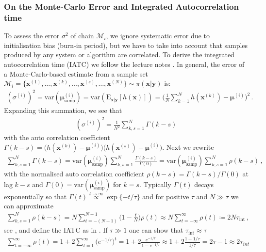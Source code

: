 \subsubsection{On the Monte-Carlo Error and Integrated Autocorrelation time}
To assess the error $\sigma^2$ of chain $\mathcal{M}_i$, we ignore systematic error due to initialisation bias (burn-in period), but we have to take into account that samples produced by any system or algorithm are correlated.
To derive the integrated autocorrelation time (IATC) we follow the lecture notes \cite{wolff2002LecNot}.
In general, the error of a Monte-Carlo-based estimate from a sample set $\mathcal{M}_i = \{\bm{x}^{(1)}, \dots,\bm{x}^{(k)},\dots, \bm{x}^{(s)},\dots, \bm{x}^{(N)}\} \sim \pi(\bm{x}|\bm{y})$ is:
\begin{align}
	(\sigma^{(i)})^2 = \text{var}(\bm{\mu}^{(i)}_{\text{samp}} ) =  \text{var}(\text{E}_{\bm{x}|\bm{y}} [h(\bm{x})]) = \Bigg( \frac{1}{N} \sum_{k=1}^{N} h(\bm{x}^{(k)}) - \bm{\mu}^{(i)} \Bigg)^2 \, .
\end{align}
Expanding this summation, we see that
\begin{align}
	(\sigma^{(i)})^2 = \frac{1}{N^2} \sum_{k,s=1}^{N} \Gamma(k-s)
\end{align}
with the auto correlation coefficient $\Gamma(k-s) =  \big( h(\bm{x}^{(k)}) - \bm{\mu}^{(i)} \big) \big(h(\bm{x}^{(s)}) - \bm{\mu}^{(i)} \big)$.
Next we rewrite
\begin{align}
 	\sum_{k,s=1}^{N} \Gamma(k-s) = \text{var}(\bm{\mu}^{(i)}_{\text{samp}})  \sum_{k,s=1}^{N} \frac{\Gamma(k-s)}{\Gamma(0)} =  \text{var}(\bm{\mu}^{(i)}_{\text{samp}}) \sum_{k,s=1}^{N}\rho(k-s)\, ,
\end{align}
with the normalised auto correlation coefficient $\rho(k-s) =  \Gamma(k-s)/ \Gamma(0)$ at lag $k-s$ and $\Gamma(0) = \text{var}(\bm{\mu}^{(i)}_{\text{samp}} )$ for $k=s$.
Typically $\Gamma(t)$ decays exponentially so that $\Gamma(t) \overset{t \rightarrow \infty }{ \propto} \exp\{ - t / \tau \}  $ and for positive $\tau$ and $N\gg \tau$ we can approximate
\begin{align}
 \sum_{k,s=1}^{N}\rho(k-s)  = N \sum_{t = -(N-1) }^{N-1} \Bigg(1- \frac{t}{N} \Bigg) \rho(t)  \approx N  \sum_{t = - \infty }^{\infty} \rho(t) \coloneqq 2 N \tau_{\text{int}}\, ,
\end{align}
see \cite{Sokal1997}, and define the IATC as in \cite[pp. 103-105]{wolff2002LecNot}.
If $\tau \gg 1$ one can show that $\tau_{\text{int}} \approx \tau$
\begin{align}
	\sum_{t = - \infty }^{\infty} \rho(t) =  1 + 2 \sum_{t = 1}^{\infty} \big(e^{-1/ \tau}\big)^t =  1 + 2 \frac{e^{-1/ \tau} }{1 - e^{-1/ \tau}} \approx  1 + 2 \frac{1 -1/ \tau }{1/ \tau} =  2 \tau -1 \approx 2 \tau_{int}
\end{align}
